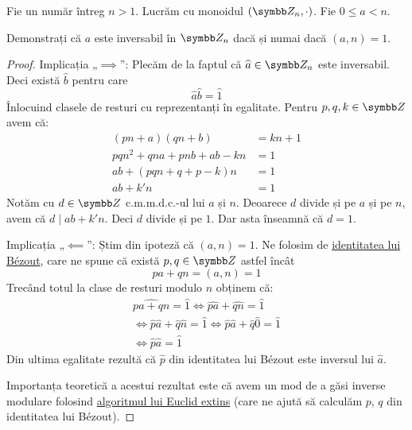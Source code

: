 \begin{exercise}
Fie un număr întreg \(n > 1\). Lucrăm cu monoidul \((\integersmod{n}, \cdot)\). Fie \(0 \leq a < n\).

Demonstrați că \(a\) este inversabil în \(\integersmod{n}\) dacă și numai dacă \((a, n) = 1\).
\end{exercise}
\begin{proof}
Implicația „\(\implies\)”:
Plecăm de la faptul că \(\widehat{a} \in \integersmod{n}\) este inversabil. Deci există \(\widehat{b}\) pentru care
\[
   \widehat{a} \widehat{b} = \widehat{1}
\]
Înlocuind clasele de resturi cu reprezentanți în egalitate. Pentru \(p, q, k \in \integers\) avem că:
\begin{align*}
    (p n + a) (q n + b) &= k n + 1 \\
    p q n^2 + q n a + p n b + a b - kn &= 1 \\
    a b + (p q n + q + p - k) n &= 1 \\
    a b + k' n &= 1 \tag{notăm coeficientul lui \(n\) cu \(k'\)}
\end{align*}
Notăm cu \(d \in \integers\) c.m.m.d.c.-ul lui \(a\) și \(n\). Deoarece \(d\) divide și pe \(a\) și pe \(n\), avem că \(d \mid a b + k' n\). Deci \(d\) divide și pe \(1\). Dar asta înseamnă că \(d = 1\).

Implicația „\(\impliedby\)”:
Știm din ipoteză că \((a, n) = 1\). Ne folosim de \href{https://ro.wikipedia.org/wiki/Identitatea_lui_Bézout}{identitatea lui Bézout}, care ne spune că există \(p, q \in \integers\) astfel încât
\[
    p a + q n = (a, n) = 1
\]
Trecând totul la clase de resturi modulo \(n\) obținem că:
\begin{gather*}
    \widehat{p a + q n} = \widehat{1} \iff \widehat{p a} + \widehat{q n} = \widehat{1} \\
    \iff \widehat{p} \widehat{a} + \widehat{q} \widehat{n} = \widehat{1} \iff \widehat{p} \widehat{a} + \widehat{q} \widehat{0} = \widehat{1} \\
    \iff \widehat{p} \widehat{a} = \widehat{1}
\end{gather*}
Din ultima egalitate rezultă că \(\widehat{p}\) din identitatea lui Bézout este inversul lui \(\widehat{a}\).

Importanța teoretică a acestui rezultat este că avem un mod de a găsi inverse modulare folosind \href{https://en.wikipedia.org/wiki/Euclidean_algorithm#Extended_Euclidean_algorithm}{algoritmul lui Euclid extins} (care ne ajută să calculăm \(p\), \(q\) din identitatea lui Bézout).
\end{proof}

